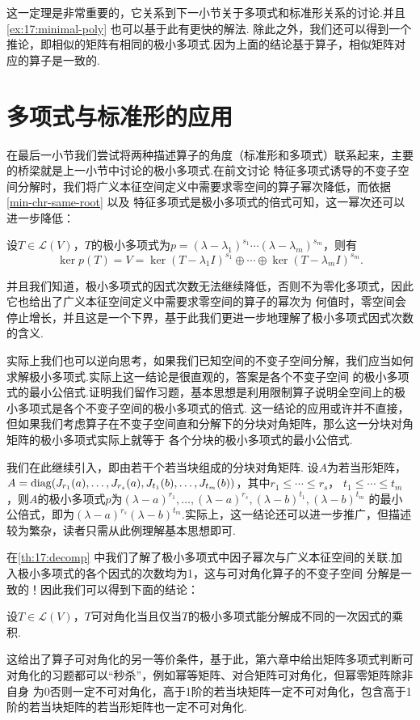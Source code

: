 这一定理是非常重要的，它关系到下一小节关于多项式和标准形关系的讨论.并且\autoref{ex:17:minimal-poly} 也可以基于此有更快的解法.
除此之外，我们还可以得到一个推论，即相似的矩阵有相同的极小多项式.因为上面的结论基于算子，相似矩阵对应的算子是一致的.

\section{多项式与标准形的应用}
在最后一小节我们尝试将两种描述算子的角度（标准形和多项式）联系起来，主要的桥梁就是上一小节中讨论的极小多项式.在前文讨论
特征多项式诱导的不变子空间分解时，我们将广义本征空间定义中需要求零空间的算子幂次降低，而依据\autoref{min-chr-same-root} 以及
特征多项式是极小多项式的倍式可知，这一幂次还可以进一步降低：
\begin{theorem} \label{th:17:decomp} %
    设$T\in \mathcal{L}(V)$，$T$的极小多项式为$p=(\lambda-\lambda_1)^{s_1}\cdots(\lambda-\lambda_m)^{s_m}$，则有
    \[\ker p(T)=V=\ker (T-\lambda_1I)^{s_1}\oplus\cdots\oplus\ker (T-\lambda_mI)^{s_m}.\]
\end{theorem}
并且我们知道，极小多项式的因式次数无法继续降低，否则不为零化多项式，因此它也给出了广义本征空间定义中需要求零空间的算子的幂次为
何值时，零空间会停止增长，并且这是一个下界，基于此我们更进一步地理解了极小多项式因式次数的含义.

实际上我们也可以逆向思考，如果我们已知空间的不变子空间分解，我们应当如何求解极小多项式.实际上这一结论是很直观的，答案是各个不变子空间
的极小多项式的最小公倍式.证明我们留作习题，基本思想是利用限制算子说明全空间上的极小多项式是各个不变子空间的极小多项式的倍式.
这一结论的应用或许并不直接，但如果我们考虑算子在不变子空间直和分解下的分块对角矩阵，那么这一分块对角矩阵的极小多项式实际上就等于
各个分块的极小多项式的最小公倍式.
\begin{example} \label{th:17:jordan-min-poly} %
    我们在此继续引入，即由若干个若当块组成的分块对角矩阵. 设$A$为若当形矩阵，
    $A=\operatorname{diag}(J_{r_1}(a),\ldots,J_{r_s}(a),J_{t_1}(b),\ldots,J_{t_m}(b))$，其中$r_1\leqslant\cdots\leqslant r_s$，
    $t_1\leqslant\cdots\leqslant t_m$，则$A$的极小多项式$p$为$(\lambda-a)^{r_1},\ldots,(\lambda-a)^{r_s},(\lambda-b)^{t_1},(\lambda-b)^{t_m}$
    的最小公倍式，即为$(\lambda-a)^{r_s}(\lambda-b)^{t_m}$.实际上，这一结论还可以进一步推广，但描述较为繁杂，读者只需从此例理解基本思想即可.
\end{example}
在\autoref{th:17:decomp} 中我们了解了极小多项式中因子幂次与广义本征空间的关联.加入极小多项式的各个因式的次数均为1，这与可对角化算子的不变子空间
分解是一致的！因此我们可以得到下面的结论：
\begin{theorem}
    设$T\in \mathcal{L}(V)$，$T$可对角化当且仅当$T$的极小多项式能分解成不同的一次因式的乘积.
\end{theorem}
这给出了算子可对角化的另一等价条件，基于此，第六章中给出矩阵多项式判断可对角化的习题都可以``秒杀''，例如幂等矩阵、对合矩阵可对角化，但幂零矩阵除非自身
为0否则一定不可对角化，高于1阶的若当块矩阵一定不可对角化，包含高于1阶的若当块矩阵的若当形矩阵也一定不可对角化.

